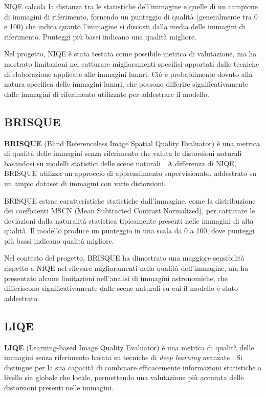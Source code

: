 NIQE calcola la distanza tra le statistiche dell'immagine e quelle di un campione di immagini di riferimento, fornendo un punteggio di qualità (generalmente tra 0 e 100) che indica quanto l'immagine si discosti dalla media delle immagini di riferimento. Punteggi più bassi indicano una qualità migliore.

Nel progetto, NIQE è stata testata come possibile metrica di valutazione, ma ha mostrato limitazioni nel catturare miglioramenti specifici apportati dalle tecniche di elaborazione applicate alle immagini lunari. Ciò è probabilmente dovuto alla natura specifica delle immagini lunari, che possono differire significativamente dalle immagini di riferimento utilizzate per addestrare il modello.

\subsection{BRISQUE} \label{subsec:brisque}

\textbf{BRISQUE} (Blind Referenceless Image Spatial Quality Evaluator) è una metrica di qualità delle immagini senza riferimento che valuta le distorsioni naturali basandosi su modelli statistici delle scene naturali \cite{brisque}. A differenza di NIQE, BRISQUE utilizza un approccio di apprendimento supervisionato, addestrato su un ampio dataset di immagini con varie distorsioni.

BRISQUE estrae caratteristiche statistiche dall'immagine, come la distribuzione dei coefficienti MSCN (Mean Subtracted Contrast Normalized), per catturare le deviazioni dalla naturalità statistica tipicamente presenti nelle immagini di alta qualità. Il modello produce un punteggio in una scala da 0 a 100, dove punteggi più bassi indicano qualità migliore.

Nel contesto del progetto, BRISQUE ha dimostrato una maggiore sensibilità rispetto a NIQE nel rilevare miglioramenti nella qualità dell'immagine, ma ha presentato alcune limitazioni nell'analisi di immagini astronomiche, che differiscono significativamente dalle scene naturali su cui il modello è stato addestrato.

\subsection{LIQE} \label{subsec:liqe}

\textbf{LIQE} (Learning-based Image Quality Evaluator) è una metrica di qualità delle immagini senza riferimento basata su tecniche di \textit{deep learning} avanzate \cite{liqe}. Si distingue per la sua capacità di combinare efficacemente informazioni statistiche a livello sia globale che locale, permettendo una valutazione più accurata delle distorsioni presenti nelle immagini.

